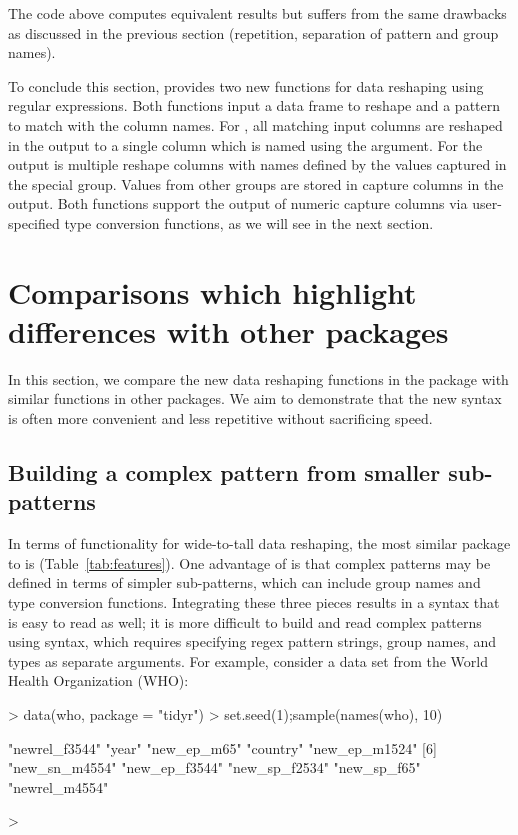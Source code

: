 The code above computes equivalent results but suffers from the
same drawbacks as discussed in the previous section (repetition,
separation of pattern and group names).

To conclude this section,  provides two new functions for data
reshaping using regular expressions. Both functions input a data
frame to reshape and a pattern to match with the column names. For
, all matching input columns are
reshaped in the output to a single column which is named using the
 argument. For  the
output is multiple reshape columns with names defined by the values
captured in the special  group. Values from other
groups are stored in capture columns in the output. Both functions
support the output of numeric capture columns via user-specified type
conversion functions, as we will see in the next section.

\section{Comparisons which highlight differences with other packages}

In this section, we compare the new data reshaping functions in the
 package with similar functions in other packages. We aim to
demonstrate that the new  syntax is often more convenient and
less repetitive without sacrificing speed.

\subsection{Building a complex pattern from smaller sub-patterns}

In terms of functionality for wide-to-tall data reshaping, the most
similar package to  is 
(Table~\ref{tab:features}). One advantage of  is that complex
patterns may be defined in terms of simpler sub-patterns, which can
include group names and type conversion functions. Integrating these
three pieces results in a syntax that is easy to read as well; it is
more difficult to build and read complex patterns using 
syntax, which requires specifying regex pattern strings, group names,
and types as separate arguments. For example, consider a data set from
the World Health Organization (WHO):

\begin{Schunk}
\begin{Sinput}
> data(who, package = "tidyr")
> set.seed(1);sample(names(who), 10)
\end{Sinput}
\begin{Soutput}
 [1] "newrel_f3544" "year"         "new_ep_m65"   "country"      "new_ep_m1524"
 [6] "new_sn_m4554" "new_ep_f3544" "new_sp_f2534" "new_sp_f65"   "newrel_m4554"
\end{Soutput}
\begin{Sinput}
> 
\end{Sinput}
\end{Schunk}

